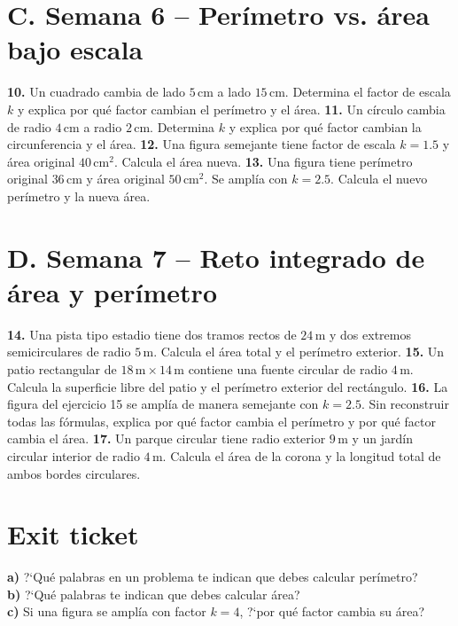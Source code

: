 \documentclass[11pt]{article}
\newcommand{\work}[1]{\vspace{#1}}
\begin{document}
\section*{C. Semana 6 -- Per\'imetro vs. \'area bajo escala}
\textbf{10.} Un cuadrado cambia de lado $5\,\mathrm{cm}$ a lado $15\,\mathrm{cm}$. Determina el factor de escala $k$ y explica por qu\'e factor cambian el per\'imetro y el \'area.
\work{2.3cm}
\textbf{11.} Un c\'irculo cambia de radio $4\,\mathrm{cm}$ a radio $2\,\mathrm{cm}$. Determina $k$ y explica por qu\'e factor cambian la circunferencia y el \'area.
\work{2.3cm}
\textbf{12.} Una figura semejante tiene factor de escala $k=1.5$ y \'area original $40\,\mathrm{cm}^2$. Calcula el \'area nueva.
\work{2.3cm}
\textbf{13.} Una figura tiene per\'imetro original $36\,\mathrm{cm}$ y \'area original $50\,\mathrm{cm}^2$. Se ampl\'ia con $k=2.5$. Calcula el nuevo per\'imetro y la nueva \'area.
\work{2.3cm}
\newpage
\section*{D. Semana 7 -- Reto integrado de \'area y per\'imetro}
\textbf{14.} Una pista tipo estadio tiene dos tramos rectos de $24\,\mathrm{m}$ y dos extremos semicirculares de radio $5\,\mathrm{m}$. Calcula el \'area total y el per\'imetro exterior.
\work{2.5cm}
\textbf{15.} Un patio rectangular de $18\,\mathrm{m}\times14\,\mathrm{m}$ contiene una fuente circular de radio $4\,\mathrm{m}$. Calcula la superficie libre del patio y el per\'imetro exterior del rect\'angulo.
\work{2.5cm}
\textbf{16.} La figura del ejercicio 15 se ampl\'ia de manera semejante con $k=2.5$. Sin reconstruir todas las f\'ormulas, explica por qu\'e factor cambia el per\'imetro y por qu\'e factor cambia el \'area.
\work{2.5cm}
\textbf{17.} Un parque circular tiene radio exterior $9\,\mathrm{m}$ y un jard\'in circular interior de radio $4\,\mathrm{m}$. Calcula el \'area de la corona y la longitud total de ambos bordes circulares.
\work{2.5cm}
\section*{Exit ticket}
\textbf{a)} ?`Qu\'e palabras en un problema te indican que debes calcular per\'imetro?\\
\textbf{b)} ?`Qu\'e palabras te indican que debes calcular \'area?\\
\textbf{c)} Si una figura se ampl\'ia con factor $k=4$, ?`por qu\'e factor cambia su \'area?
\end{document}
